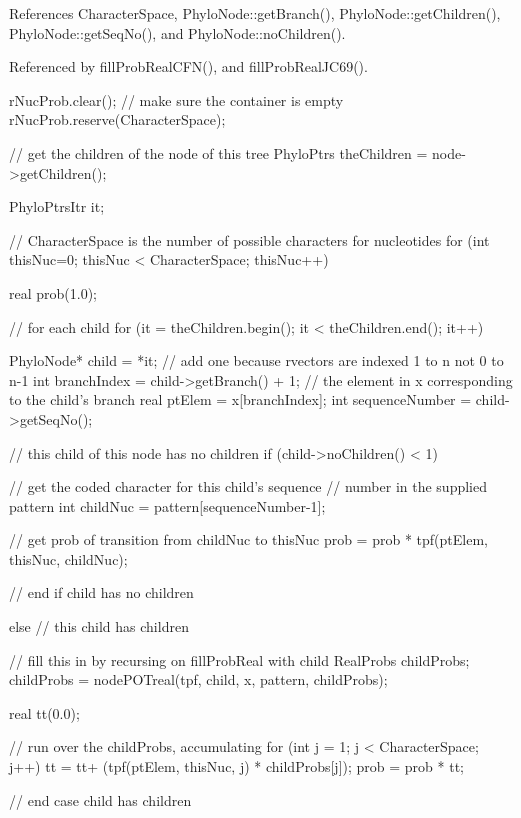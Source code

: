 \-References \-Character\-Space, \-Phylo\-Node\-::get\-Branch(), \-Phylo\-Node\-::get\-Children(), \-Phylo\-Node\-::get\-Seq\-No(), and \-Phylo\-Node\-::no\-Children().



\-Referenced by fill\-Prob\-Real\-C\-F\-N(), and fill\-Prob\-Real\-J\-C69().


\begin{DoxyCode}
{
  rNucProb.clear(); // make sure the container is empty
  rNucProb.reserve(CharacterSpace);

                    // get the children of the node of this tree
  PhyloPtrs theChildren = node->getChildren();

  PhyloPtrsItr it;

  // CharacterSpace is the number of possible characters for nucleotides
  for (int thisNuc=0; thisNuc < CharacterSpace; thisNuc++)
  {
    real prob(1.0);

    // for each child
    for (it = theChildren.begin(); it < theChildren.end(); it++)
    {

      PhyloNode* child = *it;
                    // add one because rvectors are indexed 1 to n not 0 to n-1
      int branchIndex = child->getBranch() + 1;
                    // the element in x corresponding to the child's branch
      real ptElem = x[branchIndex];
      int sequenceNumber = child->getSeqNo();

                    // this child of this node has no children
      if (child->noChildren() < 1)
      {

        // get the coded character for this child's sequence 
        // number in the supplied pattern
        int childNuc = pattern[sequenceNumber-1];

        // get prob of transition from childNuc to thisNuc
        prob = prob * tpf(ptElem, thisNuc, childNuc);

      }             // end if child has no children

      else          // this child has children
      {

                    // fill this in by recursing on fillProbReal with child
        RealProbs childProbs;
        childProbs = nodePOTreal(tpf, child, x, pattern, childProbs);

        real tt(0.0);

        // run over the childProbs, accumulating
        for (int j = 1; j < CharacterSpace; j++)
        {
          tt = tt+ (tpf(ptElem, thisNuc, j) * childProbs[j]);
        }
        prob = prob * tt;
      }             // end case child has children

}}}
\end{DoxyCode}

